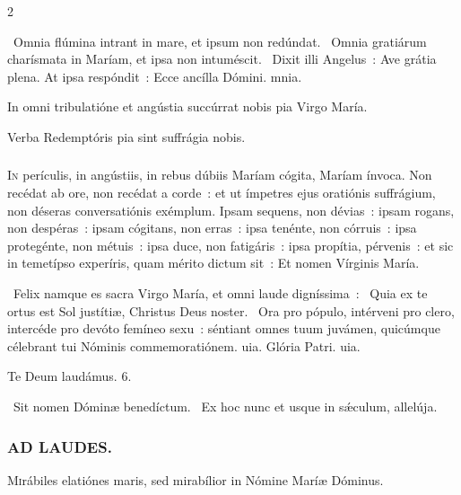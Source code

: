 \documentclass[9pt,twoside]{extarticle}
\begin{document}
\begin{multicols}{2}
\begin{tightlist}{}
\item {}~Omnia flúmina intrant in mare, et ipsum non redúndat. \textred{*}~Omnia gratiárum charísmata in Maríam, et ipsa non intuméscit. ~Dixit illi Angelus~: Ave grátia plena. At ipsa respóndit~: Ecce ancílla Dómini. mnia.
\item {\small {} In omni tribulatióne et angústia succúrrat nobis pia Virgo María.}
\item {\small {}}
\item {\small {} Verba Redemptóris pia sint suffrágia nobis.}
\end{tightlist}

\subsubsection*{\center {}}
\lettrine{I}n perículis, in angústiis, in rebus dúbiis Maríam cógita, Maríam ínvoca. Non recédat ab ore, non recédat a corde~: et ut ímpetres ejus oratiónis suffrágium, non déseras conversatiónis exémplum. Ipsam sequens, non dévias~: ipsam rogans, non despéras~: ipsam cógitans, non erras~: ipsa tenénte, non córruis~: ipsa protegénte, non métuis~: ipsa duce, non fatigáris~: ipsa propítia, pérvenis~: et sic in temetípso experíris, quam mérito dictum sit~: Et nomen Vírginis María.

\begin{tightlist}{}
\item {}~Felix namque es sacra Virgo María, et omni laude digníssima~: \textred{*}~Quia ex te ortus est Sol justítiæ, Christus Deus noster. ~Ora pro pópulo, intérveni pro clero, intercéde pro devóto femíneo sexu~: séntiant omnes tuum juvámen, quicúmque célebrant tui Nóminis commemoratiónem. uia. Glória Patri. uia.
\item Te Deum laudámus. 6.
\item {}~Sit nomen Dóminæ benedíctum. ~Ex hoc nunc et usque in sǽculum, allelúja.
\end{tightlist}

\subsubsection*{\center \textsc{AD LAUDES.}}
\begin{center}\end{center}
\lettrine{M}irábiles elatiónes maris, sed mirabílior in Nómine Maríæ Dóminus.


\end{multicols}
\end{document}
